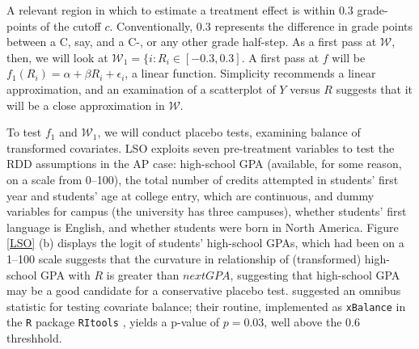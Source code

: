 \documentclass[12pt]{article}
\begin{document}
A relevant region in which to estimate a treatment effect is within
$0.3$ grade-points of the cutoff $c$.
Conventionally, $0.3$ represents the difference in grade points
between a C, say, and a C-, or any other grade half-step.
As a first pass at $\mathcal{W}$, then, we will look at
$\mathcal{W}_1=\{i:R_i\in [-0.3,0.3]$.
A first pass at $f$ will be $f_1(R_i)=\alpha +\beta R_i+\epsilon_i$, a
linear function.
Simplicity recommends a linear approximation, and an examination of a
scatterplot of $Y$ versus $R$ suggests that it will be a close
approximation in $\mathcal{W}$.



To test $f_1$ and $\mathcal{W}_1$, we will conduct placebo tests,
examining balance of transformed covariates.
LSO exploits seven pre-treatment variables to test the RDD assumptions
in the AP case: high-school GPA (available, for some reason, on a
scale from 0--100), the total number of credits attempted in
students' first year and students' age at college entry, which are
continuous, and dummy variables for campus (the university has three
campuses), whether students'
first language is English, and whether
students were born in North America.
Figure \ref{LSO} (b) displays the logit of students'
high-school GPAs, which had been on a 1--100 scale
suggests that the curvature in relationship of (transformed)
high-school GPA with $R$ is greater than $nextGPA$, suggesting that
high-school GPA may be a good candidate for a conservative placebo
test.
\citet{hansen:bowers:2008} suggested an omnibus statistic
for testing covariate balance; their routine, implemented as
\verb|xBalance| in the \verb|R| package \verb|RItools| \citep{bowers2010ritools,rcite}, yields a p-value of
$p=$0.03, well above the 0.6 threshhold.


\begin{comment}
Another important specification test for RDDs is the McCrary density test \citep{mccrary2008manipulation}.
It is designed to test whether subjects consciously sort around the cutoff by manipulating their $R$ values explicitly.
It does so by examining whether an unexpectedly large or small number of subjects find themselves just barely on one side of the cutoff or the other.
A McCrary test failure is neither necessary nor sufficient to show that subjects sorted around the cutoff; however, it is deeply suspicious.
In the LSO data, in $\mathcal{W}$, the McCrary p-value was 6.8e-08, so some amount of sorting seems likely.

AP is certainly a dubious distinction, and many students will try to avoid it.
\end{comment}
\end{document}
